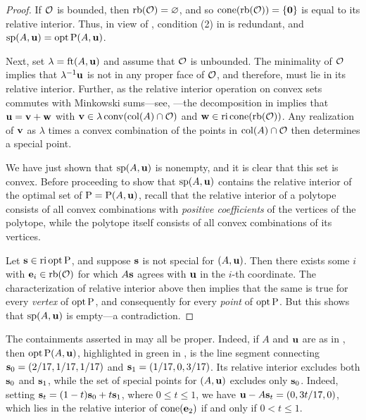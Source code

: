 \documentclass[11pt]{amsart}
\begin{document}
\begin{proof}
   If $\mathcal{O}$ is bounded, then $\operatorname{rb}(\mathcal{O}) = \varnothing$, and so $\operatorname{cone}( \operatorname{rb}(\mathcal{O})) = \{\mathbf{0} \}$ is equal to its relative interior.
   Thus, in view of , condition (2) in  is redundant, and $\operatorname{sp}(A, \mathbf{u}) = \operatorname{opt} \mathrm{P}(A, \mathbf{u})$.
   
   Next, set $\lambda = \operatorname{ft}(A, \mathbf{u})$ and assume that $\mathcal{O}$ is unbounded.
   The minimality of $\mathcal{O}$ implies that $\lambda^{-1}\mathbf{u}$ is not in any proper face of $\mathcal{O}$, and therefore, must lie in its relative interior.  Further, as the relative interior operation on convex sets commutes with Minkowski sums---see, \eg \cite[Theorem 4.10(b)]{vantiel.convex_analysis}---the decomposition in   implies that $\mathbf{u} = \mathbf{v} + \mathbf{w}$ with $\mathbf{v} \in \lambda \operatorname{conv}(\operatorname{col}(A) \cap \mathcal{O})$ and $\mathbf{w} \in \operatorname{ri} \operatorname{cone}(\operatorname{rb}(\mathcal{O}))$.  Any realization of $\mathbf{v}$ as $\lambda$ times a convex combination of the points in $\operatorname{col}(A) \cap \mathcal{O}$ then determines a special point.

 We have just shown that $\operatorname{sp}(A, \mathbf{u})$ is nonempty, and it is clear that this set is convex.
 Before proceeding to show that $\operatorname{sp}(A, \mathbf{u})$ contains the relative interior of the optimal set of $\mathrm{P} = \mathrm{P}(A,\mathbf{u})$,
  recall that the relative interior of a polytope consists of all convex combinations with \emph{positive coefficients} of the vertices of the polytope, while the polytope itself consists of all convex combinations of its vertices.

  Let $\mathbf{s} \in \operatorname{ri} \operatorname{opt} \mathrm{P}$, and suppose $\mathbf{s}$ is not special for $(A,\mathbf{u})$.
  Then there exists some $i$ with $\mathbf{e}_i \in \operatorname{rb}(\mathcal{O})$ for which $A\mathbf{s}$ agrees with $\mathbf{u}$ in the $i$-th coordinate.
  The characterization of relative interior above then implies that the same is true for every \emph{vertex} of $\operatorname{opt} \mathrm{P}$, and consequently for every \emph{point} of $\operatorname{opt} \mathrm{P}$.
  But this shows that $\operatorname{sp}(A,\mathbf{u})$ is empty---a contradiction.
\end{proof}

\begin{example}
   \label{ex: ft.1}
   The containments asserted in  may all be proper.
   Indeed, if $A$ and $\mathbf{u}$ are as in , then $\operatorname{opt} \mathrm{P}(A,\mathbf{u})$, highlighted in green in , is the line segment connecting $\mathbf{s}_0 = (2/17, 1/17, 1/17)$ and $\mathbf{s}_1 = (1/17, 0, 3/17)$.
   Its relative interior excludes both $\mathbf{s}_0$ and $\mathbf{s}_1$, while the set of special points for $(A,\mathbf{u})$ excludes only $\mathbf{s}_0$.
   Indeed, setting $\mathbf{s}_t=(1-t)\mathbf{s}_0 + t \mathbf{s}_1$, where $0\le t\le 1$, we have $\mathbf{u} - A\mathbf{s}_t = (0,3t/17,0)$, which lies in the relative interior of $\operatorname{cone}(\mathbf{e}_2)$ if and only if $0<t\le 1$.
\end{example}
\end{document}
